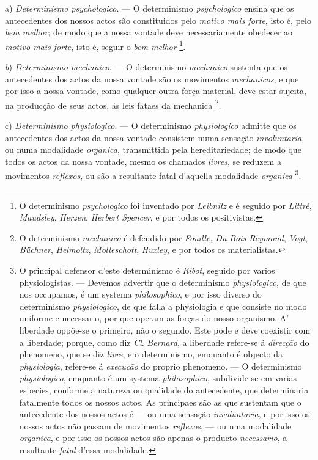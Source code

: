 a) \emph{Determinismo psychologico}. --- O determinismo \emph{psychologico} ensina que os antecedentes dos nossos actos são constituidos pelo \emph{motivo mais forte}, isto é, pelo \emph{bem melhor}; de modo que a nossa vontade deve necessariamente obedecer ao \emph{motivo mais forte}, isto é, seguir o \emph{bem melhor} \footnote{O determinismo \emph{psychologico} foi inventado por \emph{Leibnitz} e é seguido por \emph{Littré}, \emph{Maudsley}, \emph{Herzen}, \emph{Herbert Spencer}, e por todos os positivistas.}.

\emph{b}) \emph{Determinismo mechanico}. --- O determinismo \emph{mechanico} sustenta que os antecedentes dos actos da nossa vontade são os movimentos \emph{mechanicos}, e que por isso a nossa vontade, como qualquer outra força material, deve estar sujeita, na producção de seus actos, ás leis fataes da mechanica \footnote{O determinismo \emph{mechanico} é defendido por \emph{Fouillé}, \emph{Du Bois-Reymond}, \emph{Vogt}, \emph{Büchner}, \emph{Helmoltz}, \emph{Molleschott}, \emph{Huxley}, e por todos os materialistas.}.

c) \emph{Determinismo physiologico}. --- O determinismo \emph{physiologico} admitte que os antecedentes dos actos da nossa vontade consistem numa sensação \emph{involuntaria}, ou numa modalidade \emph{organica}, transmittida pela hereditariedade; de modo que todos os actos da nossa vontade, mesmo os chamados \emph{livres}, se reduzem a movimentos \emph{reflexos}, ou são a resultante fatal d'aquella modalidade \emph{organica} \footnote{O principal defensor d'este determinismo é \emph{Ribot}, seguido por varios physiologistas. --- Devemos advertir que o determinismo \emph{physiologico}, de que nos occupamos, é um systema \emph{philosophico}, e por isso diverso do determinismo \emph{physiologico}, de que falla a physiologia e que consiste no modo uniforme e necessario, por que operam as forças do nosso organismo. A' liberdade oppõe-se o primeiro, não o segundo. Este pode e deve coexistir com a liberdade; porque, como diz \emph{Cl}. \emph{Bernard}, a liberdade refere-se á \emph{direcção} do phenomeno, que se diz \emph{livre}, e o determinismo, emquanto é objecto da \emph{physiologia}, refere-se á \emph{execução} do proprio phenomeno. --- O determinismo \emph{physiologico}, emquanto é um systema \emph{philosophico}, subdivide-se em varias especies, conforme a natureza ou qualidade do antecedente, que determinaria fatalmente todos os nossos actos. As principaes são as que sustentam que o antecedente dos nossos actos é --- ou uma sensação \emph{involuntaria}, e por isso os nossos actos não passam de movimentos \emph{reflexos}, --- ou uma modalidade \emph{organica}, e por isso os nossos actos são apenas o producto \emph{necessario}, a resultante \emph{fatal} d'essa modalidade.}.


